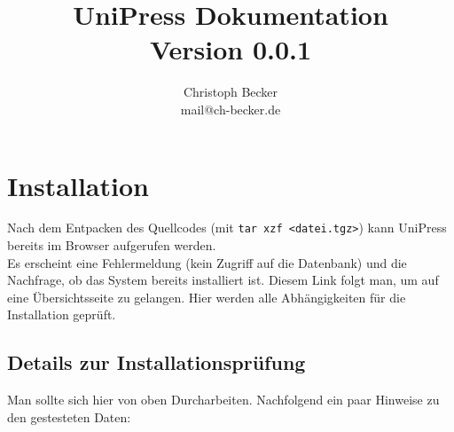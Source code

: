 \documentclass[a4paper,10pt,twoside]{article}
\title{
	UniPress Dokumentation\\
	Version 0.0.1\\
}
\author{
	Christoph Becker \\
	mail@ch-becker.de
}
\begin{document}
\maketitle
\section{Installation}
 Nach dem Entpacken des Quellcodes (mit \texttt{tar
 xzf <datei.tgz>}) kann UniPress bereits im Browser aufgerufen werden.\\
 Es erscheint eine Fehlermeldung (kein Zugriff auf die Datenbank) und die
 Nach\-frage, ob das System bereits installiert ist. Diesem Link folgt man, um auf
 eine Über\-sichts\-seite zu gelangen. Hier werden alle Abhängigkeiten für die
 Installation geprüft. 

 \subsection{Details zur Installationsprüfung}
 Man sollte sich hier von oben Durcharbeiten. Nachfolgend
 ein paar Hinweise zu den gestesteten Daten:
\end{document}
